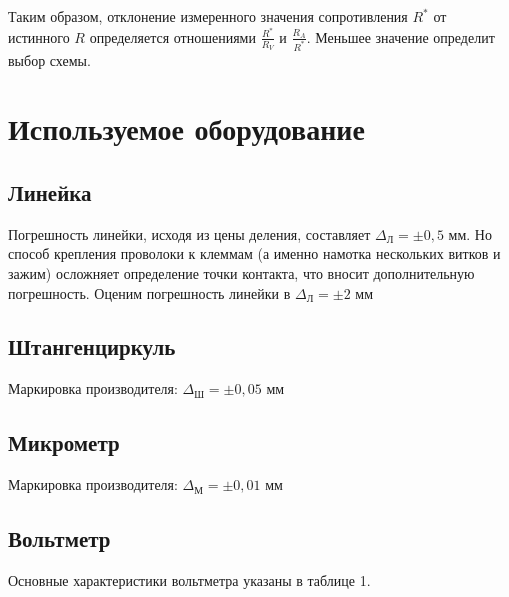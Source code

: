 \documentclass{report}
\begin{document}
	
	Таким образом, отклонение измеренного значения сопротивления $R^{*}$ от истинного $R$ определяется отношениями $\frac{R^{*}}{R_{V}}$ и $\frac{R_{A}}{R^{*}}$. Меньшее значение определит выбор схемы. 
	
	\section*{Используемое оборудование}
	
	\subsection*{Линейка}
	Погрешность линейки, исходя из цены деления, составляет $\Delta_{\text{Л}} = \pm 0,5$ мм. Но способ крепления проволоки к клеммам (а именно намотка нескольких витков и зажим) осложняет определение точки контакта, что вносит дополнительную погрешность. Оценим погрешность линейки в $\Delta_{\text{Л}} = \pm 2$ мм
	
	\subsection*{Штангенциркуль}
	Маркировка производителя: $\Delta_{\text{Ш}} = \pm 0,05$ мм
	
	\subsection*{Микрометр}
	Маркировка производителя: $\Delta_{М} = \pm 0,01$ мм
	
	\subsection*{Вольтметр}
	
	Основные характеристики вольтметра указаны в таблице 1.
	
	\begin{table}[!h]
		\centering
	\end{table}
	
\end{document}
